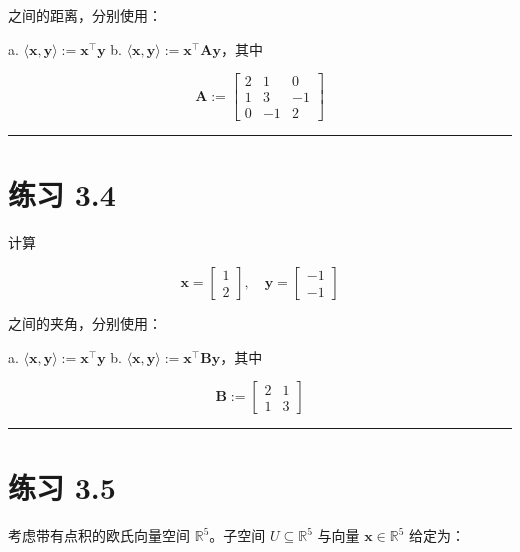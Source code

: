 之间的距离，分别使用：

a. $ \langle\boldsymbol{x}, \boldsymbol{y}\rangle := \boldsymbol{x}^\top \boldsymbol{y} $ b. $ \langle\boldsymbol{x}, \boldsymbol{y}\rangle := \boldsymbol{x}^\top \boldsymbol{A} \boldsymbol{y} $，其中

\begin{equation*}
\boldsymbol{A} := \begin{bmatrix} 2 & 1 & 0 \\ 1 & 3 & -1 \\ 0 & -1 & 2 \end{bmatrix}
\end{equation*}

\medskip\hrule\medskip

\section*{练习 3.4}

计算

\begin{equation*}
\boldsymbol{x} = \begin{bmatrix} 1 \\ 2 \end{bmatrix}, \quad \boldsymbol{y} = \begin{bmatrix} -1 \\ -1 \end{bmatrix}
\end{equation*}

之间的夹角，分别使用：

a. $ \langle\boldsymbol{x}, \boldsymbol{y}\rangle := \boldsymbol{x}^\top \boldsymbol{y} $ b. $ \langle\boldsymbol{x}, \boldsymbol{y}\rangle := \boldsymbol{x}^\top \boldsymbol{B} \boldsymbol{y} $，其中

\begin{equation*}
\boldsymbol{B} := \begin{bmatrix} 2 & 1 \\ 1 & 3 \end{bmatrix}
\end{equation*}

\medskip\hrule\medskip

\section*{练习 3.5}

考虑带有点积的欧氏向量空间 $ \mathbb{R}^5 $。子空间 $ U \subseteq \mathbb{R}^5 $ 与向量 $ \boldsymbol{x} \in \mathbb{R}^5 $ 给定为：

